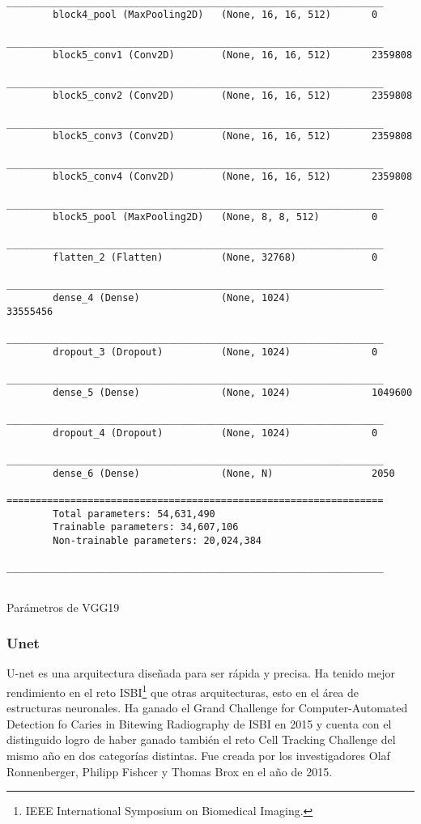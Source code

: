 \begin{table}[H]
\begin{lstlisting}
        _________________________________________________________________
        block4_pool (MaxPooling2D)   (None, 16, 16, 512)       0         
        _________________________________________________________________
        block5_conv1 (Conv2D)        (None, 16, 16, 512)       2359808   
        _________________________________________________________________
        block5_conv2 (Conv2D)        (None, 16, 16, 512)       2359808   
        _________________________________________________________________
        block5_conv3 (Conv2D)        (None, 16, 16, 512)       2359808   
        _________________________________________________________________
        block5_conv4 (Conv2D)        (None, 16, 16, 512)       2359808   
        _________________________________________________________________
        block5_pool (MaxPooling2D)   (None, 8, 8, 512)         0         
        _________________________________________________________________
        flatten_2 (Flatten)          (None, 32768)             0         
        _________________________________________________________________
        dense_4 (Dense)              (None, 1024)              33555456  
        _________________________________________________________________
        dropout_3 (Dropout)          (None, 1024)              0         
        _________________________________________________________________
        dense_5 (Dense)              (None, 1024)              1049600   
        _________________________________________________________________
        dropout_4 (Dropout)          (None, 1024)              0         
        _________________________________________________________________
        dense_6 (Dense)              (None, N)                 2050      
        =================================================================
        Total parameters: 54,631,490
        Trainable parameters: 34,607,106
        Non-trainable parameters: 20,024,384
        _________________________________________________________________
        
    \end{lstlisting}
    \caption{Parámetros de VGG19}\label{tabla:modelo}
\end{table}

\subsubsection{Unet}

U-net es una arquitectura diseñada para ser rápida y precisa. Ha tenido mejor
rendimiento en el reto ISBI\footnote{IEEE International Symposium on Biomedical
Imaging.} que otras arquitecturas, esto en el área de estructuras neuronales. Ha
ganado el Grand Challenge for Computer-Automated Detection fo Caries in Bitewing
Radiography de ISBI en 2015 y cuenta con el distinguido logro de haber ganado
también el reto Cell Tracking Challenge del mismo año en dos categorías
distintas. Fue creada por los investigadores Olaf Ronnenberger, Philipp Fishcer
y Thomas Brox en el año de 2015.~\cite{Ronneberger2015}

